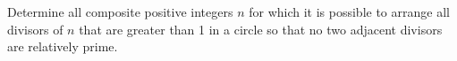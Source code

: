 Determine all composite positive integers $n$ for which it is possible to arrange all divisors of $n$ that are greater than 1 in a circle so that no two adjacent divisors are relatively prime.